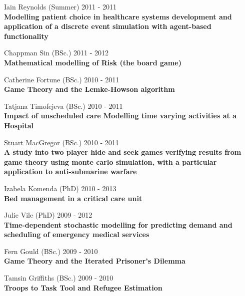 \documentclass[10pt]{res} %
\begin{document}
\begin{resume}
\begin{etaremune}
\item
    Iain Reynolds (Summer) \hfill 2011 -
    2011\\
\textbf{Modelling patient choice in healthcare systems development and application of a discrete event simulation with agent-based functionality}\\

\item
    Chappman Sin (BSc.) \hfill 2011 -
    2012\\
\textbf{Mathematical modelling of Risk (the board game)}\\

\item
    Catherine Fortune (BSc.) \hfill 2010 -
    2011\\
\textbf{Game Theory and the Lemke-Howson algorithm}\\

\item
    Tatjana Timofejeva (BSc.) \hfill 2010 -
    2011\\
\textbf{Impact of unscheduled care Modelling time varying activities at a Hospital}\\

\item
    Stuart MacGregor (BSc.) \hfill 2010 -
    2011\\
\textbf{A study into two player hide and seek games verifying results from game theory using monte carlo simulation, with a particular application to anti-submarine warfare}\\

\item
    Izabela Komenda (PhD) \hfill 2010 -
    2013\\
\textbf{Bed management in a critical care unit}\\

\item
    Julie Vile (PhD) \hfill 2009 -
    2012\\
\textbf{Time-dependent stochastic modelling for predicting demand and scheduling of emergency medical services}\\

\item
    Fern Gould (BSc.) \hfill 2009 -
    2010\\
\textbf{Game Theory and the Iterated Prisoner's Dilemma}\\

\item
    Tamsin Griffiths (BSc.) \hfill 2009 -
    2010\\
\textbf{Troops to Task Tool and Refugee Estimation}\\


\end{etaremune}
\end{resume}
\end{document}

